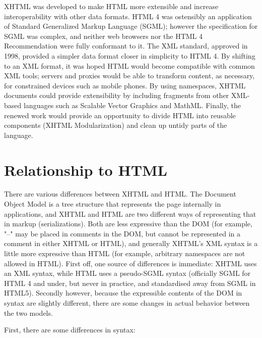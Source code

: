 XHTML was developed to make HTML more extensible and increase interoperability with other data formats. HTML 4 was ostensibly an application of Standard Generalized Markup Language (SGML); however the specification for SGML was complex, and neither web browsers nor the HTML 4 Recommendation were fully conformant to it. The XML standard, approved in 1998, provided a simpler data format closer in simplicity to HTML 4. By shifting to an XML format, it was hoped HTML would become compatible with common XML tools; servers and proxies would be able to transform content, as necessary, for constrained devices such as mobile phones. By using namespaces, XHTML documents could provide extensibility by including fragments from other XML-based languages such as Scalable Vector Graphics and MathML. Finally, the renewed work would provide an opportunity to divide HTML into reusable components (XHTML Modularization) and clean up untidy parts of the language.


\section{Relationship to HTML}

There are various differences between XHTML and HTML. The Document Object Model is a tree structure that represents the page internally in applications, and XHTML and HTML are two different ways of representing that in markup (serializations). Both are less expressive than the DOM (for example, "--" may be placed in comments in the DOM, but cannot be represented in a comment in either XHTML or HTML), and generally XHTML's XML syntax is a little more expressive than HTML (for example, arbitrary namespaces are not allowed in HTML). First off, one source of differences is immediate: XHTML uses an XML syntax, while HTML uses a pseudo-SGML syntax (officially SGML for HTML 4 and under, but never in practice, and standardised away from SGML in HTML5). Secondly however, because the expressible contents of the DOM in syntax are slightly different, there are some changes in actual behavior between the two models.


First, there are some differences in syntax:

